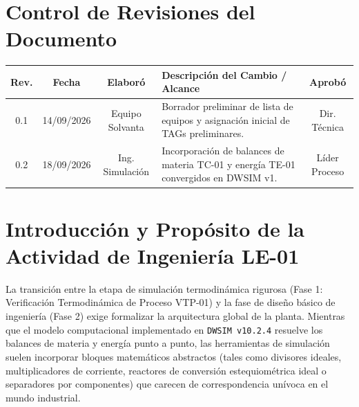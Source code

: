 \documentclass[10pt,letterpaper]{article}
\begin{document}
\section*{Control de Revisiones del Documento}

\begin{table}[H]
\centering
\small
\begin{tabularx}{\textwidth}{c c c X c}
\toprule
\textbf{Rev.} & \textbf{Fecha} & \textbf{Elaboró} & \textbf{Descripción del Cambio / Alcance} & \textbf{Aprobó} \\
\midrule
0.1 & 14/09/2026 & Equipo Solvanta & Borrador preliminar de lista de equipos y asignación inicial de TAGs preliminares. & Dir. Técnica \\
0.2 & 18/09/2026 & Ing. Simulación & Incorporación de balances de materia TC-01 y energía TE-01 convergidos en DWSIM v1. & Líder Proceso \\
\bottomrule
\end{tabularx}
\end{table}

\vspace{0.2cm}
\tableofcontents
\vspace{0.3cm}
\listoftables
\vspace{0.3cm}
\listoffigures
\newpage

\section{Introducción y Propósito de la Actividad de Ingeniería LE-01}

La transición entre la etapa de simulación termodinámica rigurosa (Fase 1: Verificación Termodinámica de Proceso VTP-01) y la fase de diseño básico de ingeniería (Fase 2) exige formalizar la arquitectura global de la planta. Mientras que el modelo computacional implementado en \texttt{DWSIM v10.2.4} resuelve los balances de materia y energía punto a punto, las herramientas de simulación suelen incorporar bloques matemáticos abstractos (tales como divisores ideales, multiplicadores de corriente, reactores de conversión estequiométrica ideal o separadores por componentes) que carecen de correspondencia unívoca en el mundo industrial.
\end{document}
